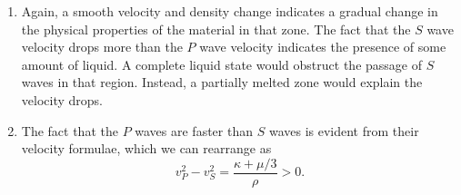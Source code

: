 \documentclass[10pt]{article}
\begin{document}
\begin{enumerate}
\begin{enumerate}
            \item Again, a smooth velocity and density change indicates a gradual
            change in the physical properties of the material in that zone.
            The fact that the $S$ wave velocity drops more than the $P$ wave
            velocity indicates the presence of some amount of liquid.
            A complete liquid state would obstruct the passage of $S$ waves in that
            region. Instead, a partially melted zone would explain the velocity
            drops.

            \item The fact that the $P$ waves are faster than $S$ waves is evident
            from their velocity formulae, which we can rearrange as \[
                v_P^2 - v_S^2 = \frac{\kappa + \mu /3}{\rho} > 0.
            \]
        \end{enumerate}
    \end{enumerate}
\end{document}
